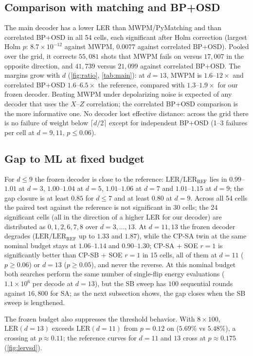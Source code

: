 \documentclass[journal]{IEEEtran}
\newcommand{\REF}{\mathrm{REF}}
\newcommand{\LER}{\mathrm{LER}}
\begin{document}
\subsection{Comparison with matching and BP+OSD}
The main decoder has a lower LER than MWPM/PyMatching and than correlated BP+OSD in all 54 cells, each significant after Holm correction (largest Holm $p$: $8.7\times10^{-12}$ against MWPM, $0.0077$ against correlated BP+OSD). Pooled over the grid, it corrects $55{,}081$ shots that MWPM fails on versus $17{,}007$ in the opposite direction, and $41{,}739$ versus $21{,}099$ against correlated BP+OSD. The margins grow with $d$ (\cref{fig:ratio}, \cref{tab:main}): at $d=13$, MWPM is $1.6$--$12\times$ and correlated BP+OSD $1.6$--$6.5\times$ the reference, compared with $1.3$--$1.9\times$ for our frozen decoder. Beating MWPM under depolarizing noise is expected of any decoder that uses the $X$--$Z$ correlation; the correlated BP+OSD comparison is the more informative one. No decoder lost effective distance: across the grid there is no failure of weight below $\lceil d/2\rceil$ except for independent BP+OSD (1--3 failures per cell at $d=9,11$, $p\le0.06$).

\subsection{Gap to ML at fixed budget}
\label{sec:gap}
For $d\le 9$ the frozen decoder is close to the reference: $\LER/\LER_\REF$ lies in $0.99$--$1.01$ at $d=3$, $1.00$--$1.04$ at $d=5$, $1.01$--$1.06$ at $d=7$ and $1.01$--$1.15$ at $d=9$; the gap closure is at least $0.85$ for $d\le7$ and at least $0.80$ at $d=9$. Across all 54 cells the paired test against the reference is not significant in 30 cells; the 24 significant cells (all in the direction of a higher LER for our decoder) are distributed as $0,1,2,6,7,8$ over $d=3,\dots,13$. At $d=11,13$ the frozen decoder degrades ($\LER/\LER_\REF$ up to $1.33$ and $1.87$), while the CP-SA twin at the same nominal budget stays at $1.06$--$1.14$ and $0.90$--$1.30$; CP-SA + SOE $r=1$ is significantly better than CP-SB + SOE $r=1$ in 15 cells, all of them at $d=11$ ($p\ge0.06$) or $d=13$ ($p\ge0.05$), and never the reverse. At this nominal budget both searches perform the same number of single-flip energy evaluations ($1.1\times10^6$ per decode at $d=13$), but the SB sweep has $100$ sequential rounds against $16{,}800$ for SA; as the next subsection shows, the gap closes when the SB sweep is lengthened.

The frozen budget also suppresses the threshold behavior. With $8\times100$, $\LER(d=13)$ exceeds $\LER(d=11)$ from $p=0.12$ on ($5.69\%$ vs $5.48\%$), a crossing at $p\approx0.11$; the reference curves for $d=11$ and $13$ cross at $p\approx0.175$ (\cref{fig:lervsd}).
\end{document}
